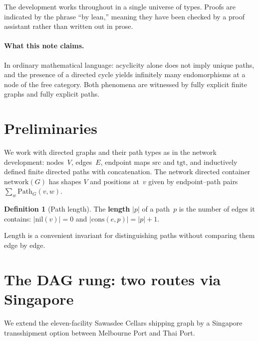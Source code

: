 \documentclass[11pt,a4paper]{article}
\theoremstyle{plain}
\theoremstyle{definition}
\newtheorem{definition}[theorem]{Definition}
\newcommand{\src}{\mathrm{src}}
\newcommand{\tgt}{\mathrm{tgt}}
\begin{document}
The development works throughout in a single universe of types. Proofs are
indicated by the phrase ``by lean,'' meaning they have been checked by a proof
assistant rather than written out in prose.

\paragraph{What this note claims.}
In ordinary mathematical language: acyclicity alone does not imply unique
paths, and the presence of a directed cycle yields infinitely many endomorphisms
at a node of the free category. Both phenomena are witnessed by fully explicit
finite graphs and fully explicit paths.

\section{Preliminaries}

We work with directed graphs and their path types as in the network
development: nodes~$V$, edges~$E$, endpoint maps $\src$ and $\tgt$, and
inductively defined finite directed paths with concatenation. The network
directed container $\mathrm{network}(G)$ has shapes $V$ and positions at~$v$
given by endpoint--path pairs $\sum_w \mathrm{Path}_G(v,w)$.

\begin{definition}[Path length]\label{def:path-len}
The \textbf{length} $\lvert p\rvert$ of a path~$p$ is the number of edges it
contains: $\lvert\mathrm{nil}(v)\rvert = 0$ and
$\lvert\mathrm{cons}(e,p)\rvert = \lvert p\rvert + 1$.
\end{definition}

Length is a convenient invariant for distinguishing paths without comparing
them edge by edge.

\section{The DAG rung: two routes via Singapore}

We extend the eleven-facility Sawasdee Cellars shipping graph by a Singapore
transshipment option between Melbourne Port and Thai Port.
\end{document}
